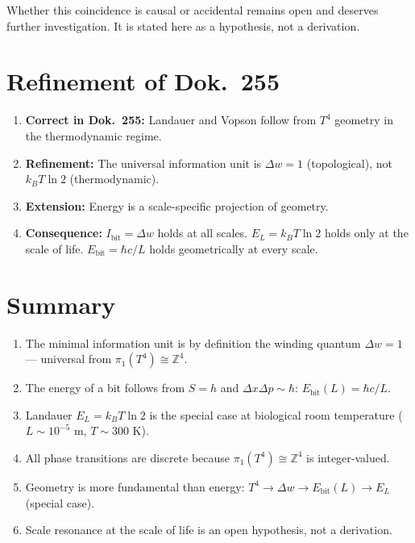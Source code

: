 Whether this coincidence is causal or accidental remains open
and deserves further investigation.
It is stated here as a hypothesis, not a derivation.

\section{Refinement of Dok.~255}

\begin{enumerate}
  \item \textbf{Correct in Dok.~255:}
        Landauer and Vopson follow from \(T^4\) geometry
        in the thermodynamic regime.
  \item \textbf{Refinement:}
        The universal information unit is \(\Delta w = 1\)
        (topological), not \(k_BT\ln2\) (thermodynamic).
  \item \textbf{Extension:}
        Energy is a scale-specific projection of geometry.
  \item \textbf{Consequence:}
        \(I_\text{bit} = \Delta w\) holds at all scales.
        \(E_L = k_BT\ln2\) holds only at the scale of life.
        \(E_\text{bit} = \hbar c/L\) holds geometrically at every scale.
\end{enumerate}

\section{Summary}

\begin{enumerate}
  \item The minimal information unit is by definition the winding
        quantum \(\Delta w = 1\) — universal from
        \(\pi_1(T^4) \cong \mathbb{Z}^4\).
  \item The energy of a bit follows from \(S = h\) and
        \(\Delta x\Delta p \sim \hbar\):
        \(E_\text{bit}(L) = \hbar c / L\).
  \item Landauer \(E_L = k_BT\ln2\) is the special case
        at biological room temperature (\(L \sim 10^{-5}\) m,
        \(T \sim 300\) K).
  \item All phase transitions are discrete because
        \(\pi_1(T^4) \cong \mathbb{Z}^4\) is integer-valued.
  \item Geometry is more fundamental than energy:
        \(T^4 \to \Delta w \to E_\text{bit}(L) \to E_L\) (special case).
  \item Scale resonance at the scale of life is an open hypothesis,
        not a derivation.
\end{enumerate}

